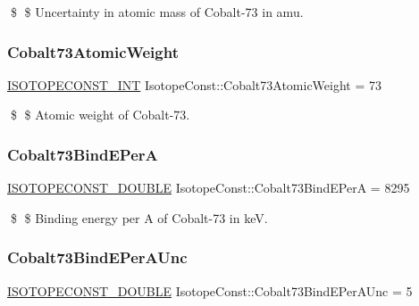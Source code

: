 \$ \$ Uncertainty in atomic mass of Cobalt-\/73 in amu. \mbox{\label{group___isotope_const-_cobalt-_co73_gaa41654b8da5d4ed40f9ed4557557b933}} 
\subsubsection{\texorpdfstring{Cobalt73\+Atomic\+Weight}{Cobalt73AtomicWeight}}
{\footnotesize\ttfamily \mbox{\hyperlink{group___isotope_const-_macros_ga5f18360b3e99483a35c32d789e62621c}{I\+S\+O\+T\+O\+P\+E\+C\+O\+N\+S\+T\+\_\+\+I\+NT}} Isotope\+Const\+::\+Cobalt73\+Atomic\+Weight = 73}

\$ \$ Atomic weight of Cobalt-\/73. \mbox{\label{group___isotope_const-_cobalt-_co73_gacea6125d263a2a5dc3e2a5239881bcb2}} 
\subsubsection{\texorpdfstring{Cobalt73\+Bind\+E\+PerA}{Cobalt73BindEPerA}}
{\footnotesize\ttfamily \mbox{\hyperlink{group___isotope_const-_macros_ga8f45a7272ce02c0b4c65c44636ed719a}{I\+S\+O\+T\+O\+P\+E\+C\+O\+N\+S\+T\+\_\+\+D\+O\+U\+B\+LE}} Isotope\+Const\+::\+Cobalt73\+Bind\+E\+PerA = 8295}

\$ \$ Binding energy per A of Cobalt-\/73 in keV. \mbox{\label{group___isotope_const-_cobalt-_co73_gaa92b8e5296dc068e28bf2bb32111f3e5}} 
\subsubsection{\texorpdfstring{Cobalt73\+Bind\+E\+Per\+A\+Unc}{Cobalt73BindEPerAUnc}}
{\footnotesize\ttfamily \mbox{\hyperlink{group___isotope_const-_macros_ga8f45a7272ce02c0b4c65c44636ed719a}{I\+S\+O\+T\+O\+P\+E\+C\+O\+N\+S\+T\+\_\+\+D\+O\+U\+B\+LE}} Isotope\+Const\+::\+Cobalt73\+Bind\+E\+Per\+A\+Unc = 5}

